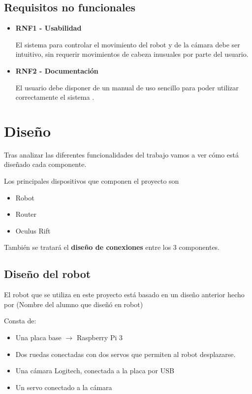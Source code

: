 \documentclass[twoside, 12pt]{epstfg}
\begin{document}
\subsection{Requisitos no funcionales}

\begin{itemize}
	\item \textbf{RNF1 - Usabilidad}
	
	
	El sistema para controlar el movimiento del robot y de la cámara debe ser intuitivo, sin requerir movimientos de cabeza inusuales por parte del usuario.
	
	
	
	\item \textbf{RNF2 - Documentación}
	
	El usuario debe disponer de un manual de uso sencillo para poder utilizar correctamente el sistema .
\end{itemize}

\newpage
\section{Diseño}

Tras analizar las diferentes funcionalidades del trabajo vamos a ver cómo está diseñado cada componente.

Los principales dispositivos que componen el proyecto son 
\begin{itemize}
	\item Robot
	\item Router
	\item Oculus Rift
\end{itemize}

También se tratará el \textbf{diseño de conexiones} entre los 3 componentes.

\subsection{Diseño del robot}

El robot que se utiliza en este proyecto está basado en un diseño anterior hecho por (Nombre del alumno que diseñó en robot)

Consta de:
\begin{itemize}
	\item Una placa base $\rightarrow$ Raspberry Pi 3
	\item Dos ruedas conectadas con dos servos que permiten al robot desplazarse.
	\item Una cámara Logitech, conectada a la placa por USB
	\item Un servo conectado a la cámara 
\end{itemize}
\end{document}
